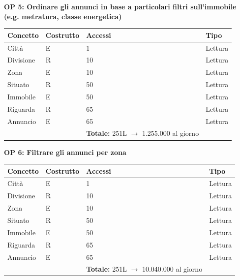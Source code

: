 \documentclass[a4paper,12pt]{report}
\begin{document}
            \newpage
            \noindent
            \textbf{OP 5: Ordinare gli annunci in base a particolari filtri sull'immobile (e.g. metratura, classe energetica)}
        	\begin{table}[H]
            \centering
             \begin{tabular}{llll}
             \rowcolor{yellow!20} \textbf{Concetto} & \textbf{Costrutto} & \textbf{Accessi} & \textbf{Tipo}\\ [0.5ex] 
             \hline
             Città & E & 1 & Lettura \\ 
             Divisione & R & 10 & Lettura \\ 
             Zona & E & 10 & Lettura \\ 
             Situato & R & 50 & Lettura \\ 
             Immobile & E & 50 & Lettura \\
             Riguarda & R & 65 & Lettura \\ 
             Annuncio & E & 65 & Lettura \\ 
             \hline
                \rowcolor{yellow!20} &   & \textbf{Totale:} 251L $\rightarrow$ 1.255.000 al giorno &  \\ [1ex] 
             
             \end{tabular}
            \end{table}

            \noindent
            \textbf{OP 6: Filtrare gli annunci per zona}
        	\begin{table}[H]
            \centering
             \begin{tabular}{llll}
             \rowcolor{yellow!20} \textbf{Concetto} & \textbf{Costrutto} & \textbf{Accessi} & \textbf{Tipo}\\ [0.5ex] 
             \hline
             Città & E & 1 & Lettura \\ 
             Divisione & R & 10 & Lettura \\ 
             Zona & E & 10 & Lettura \\ 
             Situato & R & 50 & Lettura \\ 
             Immobile & E & 50 & Lettura \\
             Riguarda & R & 65 & Lettura \\ 
             Annuncio & E & 65 & Lettura \\ 
             \hline
                \rowcolor{yellow!20} &   & \textbf{Totale:} 251L $\rightarrow$ 10.040.000 al giorno &  \\ [1ex] 
             
             \end{tabular}
            \end{table}
\end{document}
